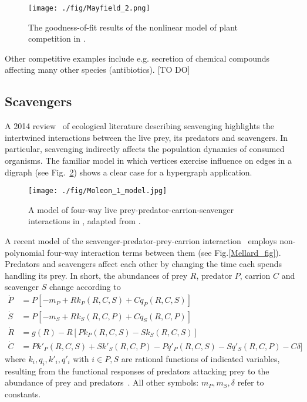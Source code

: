 \documentclass[a4paper,12pt]{article}
\theoremstyle{definition}
\theoremstyle{remark}
\begin{document}
\begin{figure}[h!]
	\begin{center}
        \texttt{[image: ./fig/Mayfield\_2.png]}
        \caption{The goodness-of-fit results of the nonlinear model of plant competition in \cite{Mayfield2017}.} 
    	\label{fig:Mayfield_2}
    \end{center}
    \end{figure}


Other competitive examples include e.g. secretion of chemical compounds affecting many other species (antibiotics). [TO DO]




\subsection{Scavengers}
A 2014 review~\cite{Moleon_scavenging} of ecological literature describing scavenging highlights the intertwined interactions between the live prey, its predators and scavengers. In particular, scavenging indirectly affects the population dynamics of consumed organisms. The familiar model in which vertices exercise influence on edges in a digraph (see Fig.~\ref{Moleon}) shows a clear case for a hypergraph application.

\begin{figure}[h!]
	\begin{center}
        \texttt{[image: ./fig/Moleon\_1\_model.jpg]}
        \caption{A model of four-way live prey-predator-carrion-scavenger interactions in \cite{Moleon_scavenging}, adapted from \cite{Getz_2011}.} 
    	\label{Moleon}
    \end{center}
    \end{figure}

  A recent model of the  scavenger-predator-prey-carrion interaction~\cite{Mellard2021} employs non-polynomial four-way interaction terms between them (see Fig.\ref{Mellard_fig}). Predators and scavengers affect each other by changing the time each spends handling its prey. In short, the abundances of prey $R$, predator $P$, carrion $C$ and scavenger $S$ change according to
\begin{align}
    \dot{P}&=P[-m_P + R k_P(R,C,S) +C q_P(R,C,S)] \\
    \dot{S}&=P[-m_S + R k_S(R,C,P) +C q_S(R,C,P)] \\
    \dot{R}&=g(R) - R[P k_P(R,C,S) - S k_S(R,C,S)] \\
    \dot{C}&=P k'_P(R,C,S) + S k'_S(R,C,P) - P q'_P(R,C,S) -S q'_S(R,C,P) - C\delta ]
\end{align}
where $k_i, q_i,k'_i, q'_i$ with $i \in {P,S}$ are rational functions of indicated variables, resulting from the functional responses of predators attacking prey to the abundance of prey and predators~\cite{holling_1959}. All other symbols: $m_P, m_S, \delta$ refer to constants.
\end{document}
